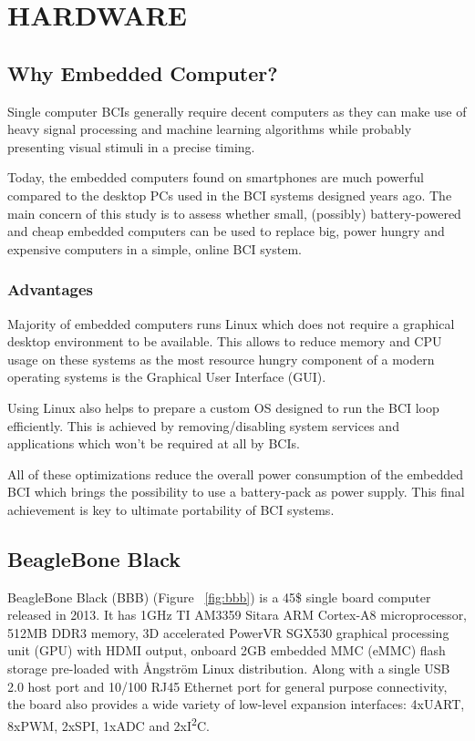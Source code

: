 \documentclass[12pt]{article}
\newcommand\mysection[1]{\vspace*{-0.35cm}\section{#1}\vspace*{6pt}\thispagestyle{empty}}
\newcommand\mysubsection[1]{\subsection{#1}}
\newcommand\mysubsubsection[1]{\subsubsection{#1}}
\numberwithin{equation}{section}
\numberwithin{figure}{section}
\numberwithin{table}{section}
\begin{document}
\clearpage
\vspace*{-0.35cm}
\mysection{HARDWARE}\label{seq:hardware}

\mysubsection{Why Embedded Computer?}\label{seq:embeddedcomputer}

\par{
Single computer BCIs generally require decent computers as they can make use of heavy signal processing
and machine learning algorithms while probably presenting visual stimuli in a precise timing.
}

\par{
Today, the embedded computers found on smartphones are much powerful compared to the desktop PCs
used in the BCI systems designed years ago. The main concern of this study is to assess whether small,
(possibly) battery-powered and cheap embedded computers can be used to replace big, power hungry and
expensive computers in a simple, online BCI system.
}

\mysubsubsection{Advantages}\label{seq:embeddedcomputer_advantages}

\par{
Majority of embedded computers runs Linux which does not require a graphical desktop environment
to be available. This allows to reduce memory and CPU usage on these systems as the most resource
hungry component of a modern operating systems is the Graphical User Interface (GUI).
}

\par{
Using Linux also helps to prepare a custom OS designed to run the BCI loop efficiently.
This is achieved by removing/disabling system services and applications which won't be required at all by BCIs.
}

\par{
All of these optimizations reduce the overall power consumption of the embedded BCI which brings
the possibility to use a battery-pack as power supply. This final achievement is key to ultimate
portability of BCI systems.
}

\mysubsection{BeagleBone Black}\label{seq:embeddedcomputer_bbb}

\par{
BeagleBone Black (BBB) (Figure ~\ref{fig:bbb}) is a 45\$ single board computer released in 2013. It has 1GHz TI AM3359 Sitara ARM Cortex-A8 microprocessor,
512MB DDR3 memory, 3D accelerated PowerVR SGX530 graphical processing unit (GPU) with HDMI output, onboard 2GB embedded MMC (eMMC)
flash storage pre-loaded with Ångström Linux distribution. Along with a single USB 2.0 host port and 10/100 RJ45 Ethernet port for
general purpose connectivity, the board also provides a wide variety of low-level expansion interfaces:
4xUART, 8xPWM, 2xSPI, 1xADC and 2xI\textsuperscript{2}C.
}
\end{document}
